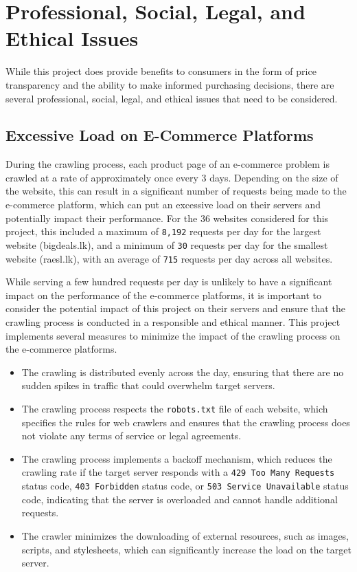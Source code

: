 \section{Professional, Social, Legal, and Ethical Issues}\label{sec:issues}

While this project does provide benefits to consumers in the form of price transparency and the ability to make informed purchasing decisions, there are several professional, social, legal, and ethical issues that need to be considered.

\subsection{Excessive Load on E-Commerce Platforms}\label{subsec:excessive-load-on-e-commerce-platforms}
During the crawling process, each product page of an e-commerce problem is crawled at a rate of approximately once every 3 days.
Depending on the size of the website, this can result in a significant number of requests being made to the e-commerce platform, which can put an excessive load on their servers and potentially impact their performance.
For the 36 websites considered for this project, this included a maximum of \texttt{8,192} requests per day for the largest website (bigdeals.lk), and a minimum of \texttt{30} requests per day for the smallest website (raesl.lk), with an average of \texttt{715} requests per day across all websites.

While serving a few hundred requests per day is unlikely to have a significant impact on the performance of the e-commerce platforms, it is important to consider the potential impact of this project on their servers and ensure that the crawling process is conducted in a responsible and ethical manner.
This project implements several measures to minimize the impact of the crawling process on the e-commerce platforms.
\begin{itemize}
    \item The crawling is distributed evenly across the day, ensuring that there are no sudden spikes in traffic that could overwhelm target servers.
    \item The crawling process respects the \texttt{robots.txt} file of each website, which specifies the rules for web crawlers and ensures that the crawling process does not violate any terms of service or legal agreements.
    \item The crawling process implements a backoff mechanism, which reduces the crawling rate if the target server responds with a \texttt{429 Too Many Requests} status code, \texttt{403 Forbidden} status code, or \texttt{503 Service Unavailable} status code, indicating that the server is overloaded and cannot handle additional requests.
    \item The crawler minimizes the downloading of external resources, such as images, scripts, and stylesheets, which can significantly increase the load on the target server.
\end{itemize}

